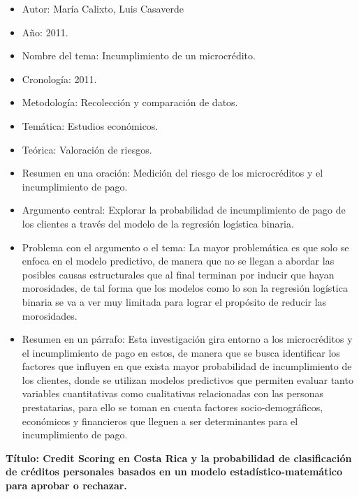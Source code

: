 \documentclass[
  letterpaper,
  DIV=11,
  numbers=noendperiod]{scrreprt}
\begin{document}
\begin{itemize}
\item
  Autor: María Calixto, Luis Casaverde
\item
  Año: 2011.
\item
  Nombre del tema: Incumplimiento de un microcrédito.
\item
  Cronología: 2011.
\item
  Metodología: Recolección y comparación de datos.
\item
  Temática: Estudios económicos.
\item
  Teórica: Valoración de riesgos.
\item
  Resumen en una oración: Medición del riesgo de los microcréditos y el
  incumplimiento de pago.
\item
  Argumento central: Explorar la probabilidad de incumplimiento de pago
  de los clientes a través del modelo de la regresión logística binaria.
\item
  Problema con el argumento o el tema: La mayor problemática es que solo
  se enfoca en el modelo predictivo, de manera que no se llegan a
  abordar las posibles causas estructurales que al final terminan por
  inducir que hayan morosidades, de tal forma que los modelos como lo
  son la regresión logística binaria se va a ver muy limitada para
  lograr el propósito de reducir las morosidades.
\item
  Resumen en un párrafo: Esta investigación gira entorno a los
  microcréditos y el incumplimiento de pago en estos, de manera que se
  busca identificar los factores que influyen en que exista mayor
  probabilidad de incumplimiento de los clientes, donde se utilizan
  modelos predictivos que permiten evaluar tanto variables cuantitativas
  como cualitativas relacionadas con las personas prestatarias, para
  ello se toman en cuenta factores socio-demográficos, económicos y
  financieros que lleguen a ser determinantes para el incumplimiento de
  pago.
\end{itemize}

\textbf{Título: Credit Scoring en Costa Rica y la probabilidad de
clasificación de créditos personales basados en un modelo
estadístico-matemático para aprobar o rechazar.}
\end{document}
